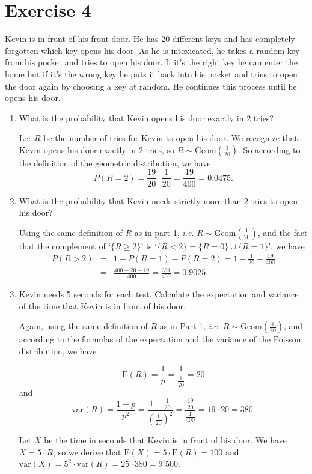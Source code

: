 \documentclass[12pt,thmsa]{article}\usepackage[]{graphicx}\usepackage[]{color}
\begin{document}
\section*{Exercise 4}


Kevin is in front of his front door. He has 20 different keys and has completely forgotten which key opens his door. As he is intoxicated, he takes a random key from his pocket and tries to open his door. If it's the right key he can enter the home but if it's the wrong key he puts it back into his pocket and tries to open the door again by choosing a key at random. He continues this process until he opens his door.

\begin{enumerate}
\item What is the probability that Kevin opens his door exactly in 2 tries?

Let $R$ be the number of tries for Kevin to open his door. We recognize that Kevin opens his door exactly in 2 tries, so $ R \sim \text {Geom} (\frac{1}{20}) $. So according to the definition of the geometric distribution, we have
\begin{equation*}
P(R=2)= \frac{19}{20}\cdot\frac{1}{20} = \frac{19}{400} = 0.0475.
\end{equation*}
\item What is the probability that Kevin needs strictly more than 2 tries to open his door?

Using the same definition of $R$ as in part 1, {\it i.e.} $R \sim \text {Geom} (\frac{1}{20})$, and the fact that the complement of  `$\{R\geq 2\}$' is `$\{R<2\}=\{R=0\}\cup\{R=1\}$', we have
\begin{eqnarray*}
P(R> 2)&=& 1 - P(R=1)- P(R=2) = 1 - \frac{1}{20}-\frac{19}{400} \\
&=&  \frac{400-20-19}{400} = \frac{361}{400} = 0.9025.
\end{eqnarray*}
\item Kevin needs 5 seconds for each test. Calculate the expectation and variance of the time that Kevin is in front of his door.

Again, using the same definition of $ R $ as in Part 1, {\it i.e.}  $R \sim \text {Geom} (\frac{1}{20})$, and according to the formulas of the expectation and the variance of the Poisson distribution, we have

$$
\text{E}(R) = \frac{1}{p}=\frac{1}{\frac{1}{20}} = 20
$$
and
$$
\text{var}(R) =   \frac{1-p}{p^2}= \frac{1-\frac{1}{20}}{(\frac{1}{20})^2} =
\frac{\frac{19}{20}}{\frac{1}{400}} = 19\cdot 20 = 380.
$$

Let $ X $ be the time in seconds that Kevin is in front of his door. We have $X=5
\cdot R$, so we derive that $\text{E}(X)=5\cdot \text{E}(R) = 100 $
and $\text{var}(X)=5^2 \cdot \text{var}(R) = 25 \cdot 380 = 9'500$.
\end{enumerate}
\end{document}
